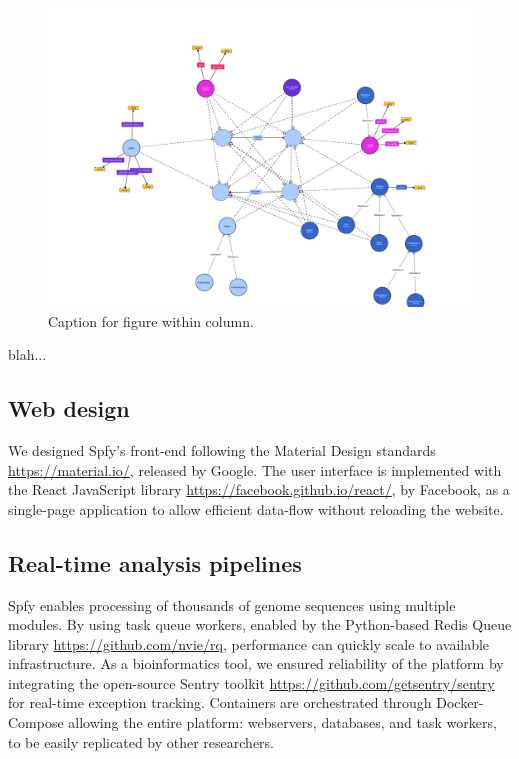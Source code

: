 \documentclass[a4,center,fleqn]{NAR}
\begin{document}
\begin{figure}[t]
\begin{center}
\includegraphics{images/spfy_ontology-1.svg}
\end{center}
\caption{Caption for figure within column.}
\label{fig-ontology}
\end{figure}

blah...

\subsection{Web design}

We designed Spfy's front-end following the Material Design standards \url{https://material.io/}, released by Google.
The user interface is implemented with the React JavaScript library \url{https://facebook.github.io/react/}, by Facebook, as a single-page application to allow efficient data-flow without reloading the website.

\subsection{Real-time analysis pipelines}

Spfy enables processing of thousands of genome sequences using multiple modules.
By using task queue workers, enabled by the Python-based Redis Queue library \url{https://github.com/nvie/rq}, performance can quickly scale to available infrastructure.
As a bioinformatics tool, we ensured reliability of the platform by integrating the open-source Sentry toolkit \url{https://github.com/getsentry/sentry} for real-time exception tracking.
Containers are orchestrated through Docker-Compose allowing the entire platform: webservers, databases, and task workers, to be easily replicated by other researchers.
\end{document}
